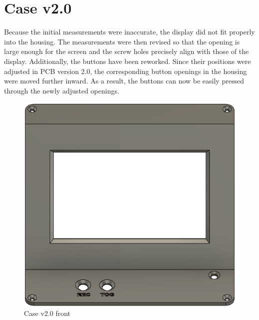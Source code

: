 \section{Case v2.0}

Because the initial measurements were inaccurate, the display did not fit properly into the housing. The measurements were then revised so that the opening is large enough for the screen and the screw holes precisely align with those of the display.
Additionally, the buttons have been reworked. Since their positions were adjusted in PCB version 2.0, the corresponding button openings in the housing were moved further inward. As a result, the buttons can now be easily pressed through the newly adjusted openings.

\begin{figure}[H]
  \centering
  \begin{minipage}{0.45\textwidth}
    \centering
    \includegraphics[width=\textwidth]{assets/Deckel v2.0 front.png}
    \caption{Case v2.0 front}
  \end{minipage}
  \hfill
  \begin{minipage}{0.45\textwidth}
    \centering

\end{minipage}
\end{figure}
